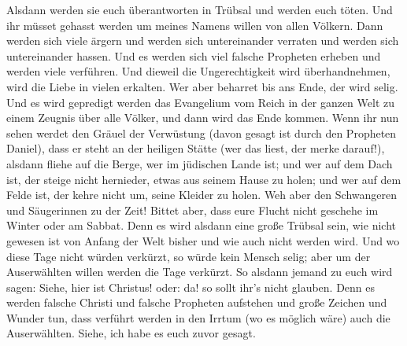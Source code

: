  Alsdann werden sie euch überantworten in Trübsal und
werden euch töten. Und ihr müsset gehasst werden um meines Namens willen
von allen Völkern.  Dann werden sich viele ärgern und
werden sich untereinander verraten und werden sich untereinander hassen.
 Und es werden sich viel falsche Propheten erheben und
werden viele verführen.  Und dieweil die Ungerechtigkeit
wird überhandnehmen, wird die Liebe in vielen erkalten. 
Wer aber beharret bis ans Ende, der wird selig.  Und es
wird gepredigt werden das Evangelium vom Reich in der ganzen Welt zu
einem Zeugnis über alle Völker, und dann wird das Ende kommen.
 Wenn ihr nun sehen werdet den Gräuel der Verwüstung
(davon gesagt ist durch den Propheten Daniel), dass er steht an der
heiligen Stätte (wer das liest, der merke darauf!), 
alsdann fliehe auf die Berge, wer im jüdischen Lande ist;
 und wer auf dem Dach ist, der steige nicht hernieder,
etwas aus seinem Hause zu holen;  und wer auf dem Felde
ist, der kehre nicht um, seine Kleider zu holen.  Weh
aber den Schwangeren und Säugerinnen zu der Zeit!  Bittet
aber, dass eure Flucht nicht geschehe im Winter oder am Sabbat.
 Denn es wird alsdann eine große Trübsal sein, wie nicht
gewesen ist von Anfang der Welt bisher und wie auch nicht werden wird.
 Und wo diese Tage nicht würden verkürzt, so würde kein
Mensch selig; aber um der Auserwählten willen werden die Tage verkürzt.
 So alsdann jemand zu euch wird sagen: Siehe, hier ist
Christus! oder: da! so sollt ihr's nicht glauben.  Denn
es werden falsche Christi und falsche Propheten aufstehen und große
Zeichen und Wunder tun, dass verführt werden in den Irrtum (wo es
möglich wäre) auch die Auserwählten.  Siehe, ich habe es
euch zuvor gesagt.

